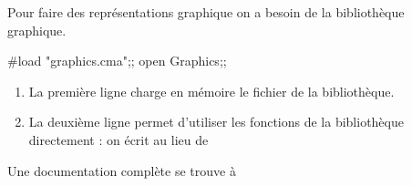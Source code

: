 Pour faire des représentations graphique on a besoin de la bibliothèque graphique.
\begin{ocaml}[]
#load "graphics.cma";;
open Graphics;;
\end{ocaml}
\begin{enumerate}
  \item La première ligne charge en mémoire le fichier de la bibliothèque.
  \item La deuxième ligne permet d'utiliser les fonctions de la bibliothèque directement : on écrit  au lieu de 
\end{enumerate}
Une documentation complète se trouve à


